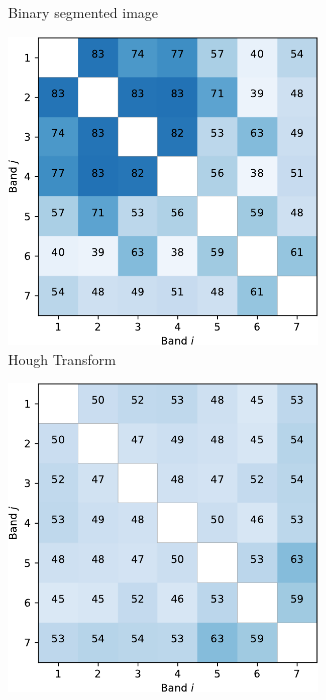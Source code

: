 \documentclass{article}
\begin{document}
\begin{figure}[h]
\begin{subfigure}[b]{0.49\linewidth}
    \caption{Binary segmented image} 
    \label{fig7:b} 
    \end{subfigure} 
  \begin{subfigure}[b]{0.49\linewidth}
    \centering
    \includegraphics[width=0.9\textwidth]{kmeans-crop.pdf} 
    \caption{Hough Transform} 
    \label{fig7:c} 
  \end{subfigure}%
  \begin{subfigure}[b]{0.49\linewidth}
    \centering
    \includegraphics[width=0.9\textwidth]{gmm-crop.pdf} 

\end{subfigure}
\end{figure}
\end{document}
